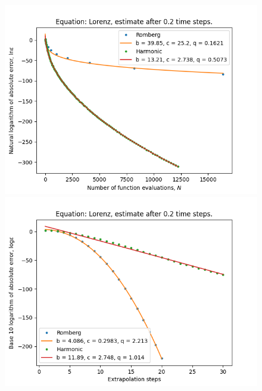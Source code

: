 \begin{figure}[H]
\centering
\begin{minipage}{0.45\textwidth}
\centering
\includegraphics[scale=0.45]{../results/emr_plots/lorenz_02_hp_trend.png}
\end{minipage}
\begin{minipage}{0.45\textwidth}
\centering
\includegraphics[scale=0.45]{../results/emr_plots/lorenz_02_hp_steps.png}
\end{minipage}
\end{figure}

